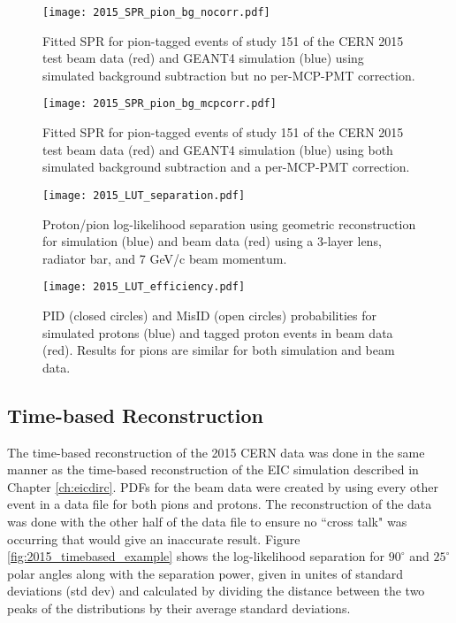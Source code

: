 \begin{figure}[!htb]
	\centering
	\texttt{[image: 2015\_SPR\_pion\_bg\_nocorr.pdf]}
	\caption{Fitted SPR for pion-tagged events of study 151 of the CERN 2015 test beam data (red) and GEANT4 simulation (blue) using simulated background subtraction but no per-MCP-PMT correction.}
	\label{fig:2015_SPR_pion_bg_nocorr}
\end{figure}

\begin{figure}[!htb]
	\centering
	\texttt{[image: 2015\_SPR\_pion\_bg\_mcpcorr.pdf]}
	\caption{Fitted SPR for pion-tagged events of study 151 of the CERN 2015 test beam data (red) and GEANT4 simulation (blue) using both simulated background subtraction and a per-MCP-PMT correction.}
	\label{fig:2015_SPR_pion_bg_mcpcorr}
\end{figure}

\begin{figure}[!htb]
	\centering
	\texttt{[image: 2015\_LUT\_separation.pdf]}
	\caption{Proton/pion log-likelihood separation using geometric reconstruction for simulation (blue) and beam data (red) using a 3-layer lens, radiator bar, and 7 GeV/c beam momentum.}
	\label{fig:2015_LUT_separation}
\end{figure}

\begin{figure}[!htb]
	\centering
	\texttt{[image: 2015\_LUT\_efficiency.pdf]}
	\caption{PID (closed circles) and MisID (open circles) probabilities for simulated protons (blue) and tagged proton events in beam data (red). Results for pions are similar for both simulation and beam data.}
	\label{fig:2015_LUT_efficiency}
\end{figure}

\clearpage
\subsection{Time-based Reconstruction}
The time-based reconstruction of the 2015 CERN data was done in the same manner as the time-based reconstruction of the EIC simulation described in Chapter \ref{ch:eicdirc}. PDFs for the beam data were created by using every other event in a data file for both pions and protons. The reconstruction of the data was done with the other half of the data file to ensure no ``cross talk" was occurring that would give an inaccurate result. Figure \ref{fig:2015_timebased_example} shows the log-likelihood separation for $90^\circ$ and $25^\circ$ polar angles along with the separation power, given in unites of standard deviations (std dev) and calculated by dividing the distance between the two peaks of the distributions by their average standard deviations.

